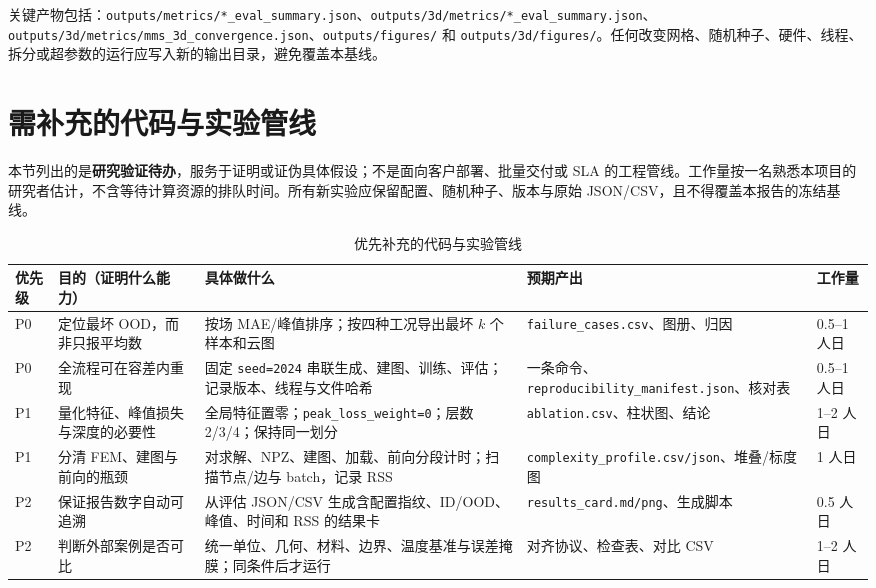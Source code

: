 \documentclass[11pt,a4paper]{article}
\newcommand{\code}[1]{\texttt{#1}}
\begin{document}
关键产物包括：\code{outputs/metrics/*\_eval\_summary.json}、\code{outputs/3d/metrics/*\_eval\_summary.json}、\code{outputs/3d/metrics/mms\_3d\_convergence.json}、\code{outputs/figures/} 和 \code{outputs/3d/figures/}。任何改变网格、随机种子、硬件、线程、拆分或超参数的运行应写入新的输出目录，避免覆盖本基线。

\section{需补充的代码与实验管线}

本节列出的是\textbf{研究验证待办}，服务于证明或证伪具体假设；不是面向客户部署、批量交付或 SLA 的工程管线。工作量按一名熟悉本项目的研究者估计，不含等待计算资源的排队时间。所有新实验应保留配置、随机种子、版本与原始 JSON/CSV，且不得覆盖本报告的冻结基线。

\begin{table}[H]
\centering
\small
\caption{优先补充的代码与实验管线}
\label{tab:research-backlog}
\begin{tabularx}{\textwidth}{p{0.8cm}p{2.05cm}YYp{1.25cm}}
\toprule
优先级 & 目的（证明什么能力） & 具体做什么 & 预期产出 & 工作量 \\
\midrule
P0 & 定位最坏 OOD，而非只报平均数 & 按场 MAE/峰值排序；按四种工况导出最坏 $k$ 个样本和云图 & \code{failure\_cases.csv}、图册、归因 & 0.5--1 人日 \\
P0 & 全流程可在容差内重现 & 固定 \code{seed=2024} 串联生成、建图、训练、评估；记录版本、线程与文件哈希 & 一条命令、\code{reproducibility\_manifest.json}、核对表 & 0.5--1 人日 \\
P1 & 量化特征、峰值损失与深度的必要性 & 全局特征置零；\code{peak\_loss\_weight=0}；层数 2/3/4；保持同一划分 & \code{ablation.csv}、柱状图、结论 & 1--2 人日 \\
P1 & 分清 FEM、建图与前向的瓶颈 & 对求解、NPZ、建图、加载、前向分段计时；扫描节点/边与 batch，记录 RSS & \code{complexity\_profile.csv/json}、堆叠/标度图 & 1 人日 \\
P2 & 保证报告数字自动可追溯 & 从评估 JSON/CSV 生成含配置指纹、ID/OOD、峰值、时间和 RSS 的结果卡 & \code{results\_card.md/png}、生成脚本 & 0.5 人日 \\
P2 & 判断外部案例是否可比 & 统一单位、几何、材料、边界、温度基准与误差掩膜；同条件后才运行 & 对齐协议、检查表、对比 CSV & 1--2 人日 \\
\bottomrule
\end{tabularx}
\end{table}
\end{document}
